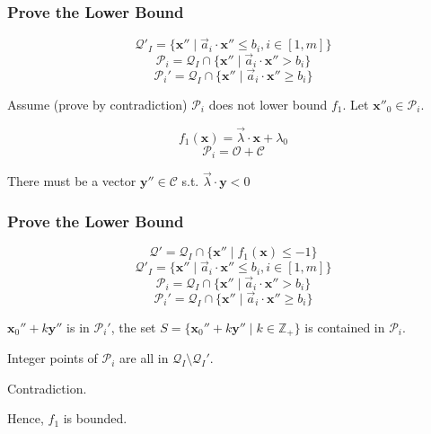 \documentclass[11pt]{beamer}
\begin{document}
\begin{frame}
\frametitle{Prove the Lower Bound}

\[\mathcal{Q}'_I = \{\textbf{x}'' \mid \vec{a}_i\cdot \textbf{x}'' \le b_i, i \in [1, m]\}\]
\[\mathcal{P}_i = \mathcal{Q}_I \cap \{\textbf{x}''\mid \vec{a}_i \cdot \textbf{x}'' > b_i\}\]
\[\mathcal{P}_i' = \mathcal{Q}_I \cap \{\textbf{x}''\mid \vec{a}_i \cdot \textbf{x}'' \ge b_i\}\]




Assume (prove by contradiction) $\mathcal{P}_i$ does not lower bound $f_1$.
Let $\textbf{x}''_0\in \mathcal{P}_i$.

\[f_1(\textbf{x}) = \vec{\lambda}\cdot \textbf{x} + \lambda_0 \]
\[\mathcal{P}_i = \mathcal{O} + \mathcal{C}\]

There must be a vector $\textbf{y}''\in \mathcal{C}$ s.t. $\vec{\lambda}\cdot \textbf{y}  < 0$


\end{frame}

\begin{frame}\frametitle{Prove the Lower Bound}

\[\mathcal{Q}' = \mathcal{Q}_I\cap \{\textbf{x}''\mid f_1(\textbf{x}) \le -1\}\]
\[\mathcal{Q}'_I = \{\textbf{x}'' \mid \vec{a}_i\cdot \textbf{x}'' \le b_i, i \in [1, m]\}\]
\[\mathcal{P}_i = \mathcal{Q}_I \cap \{\textbf{x}''\mid \vec{a}_i \cdot \textbf{x}'' > b_i\}\]
\[\mathcal{P}_i' = \mathcal{Q}_I \cap \{\textbf{x}''\mid \vec{a}_i \cdot \textbf{x}'' \ge b_i\}\]

$\textbf{x}_0'' + k\textbf{y}''$ is in $\mathcal{P}_i'$, the set $S = \{\textbf{x}_0'' + k\textbf{y}''\mid k \in \mathbb{Z}_+\}$ is contained in $\mathcal{P}_i$.

Integer points of $\mathcal{P}_i$ are all in $\mathcal{Q}_I\setminus \mathcal{Q}_I'$.

Contradiction.

Hence, $f_1$ is bounded.
\end{frame}

\fi
\end{document}
